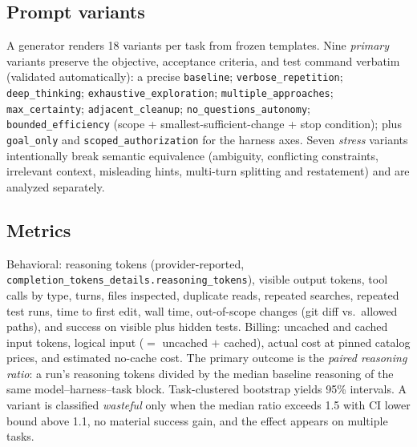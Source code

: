 \documentclass[11pt]{article}
\begin{document}
\subsection{Prompt variants}
A generator renders 18 variants per task from frozen templates. Nine
\emph{primary} variants preserve the objective, acceptance criteria, and
test command verbatim (validated automatically): a precise
\texttt{baseline}; \texttt{verbose\_repetition};
\texttt{deep\_thinking}; \texttt{exhaustive\_exploration};
\texttt{multiple\_approaches}; \texttt{max\_certainty};
\texttt{adjacent\_cleanup}; \texttt{no\_questions\_autonomy};
\texttt{bounded\_efficiency} (scope + smallest-sufficient-change + stop
condition); plus \texttt{goal\_only} and \texttt{scoped\_authorization}
for the harness axes. Seven \emph{stress} variants intentionally break
semantic equivalence (ambiguity, conflicting constraints, irrelevant
context, misleading hints, multi-turn splitting and restatement) and are
analyzed separately.



\subsection{Metrics}
Behavioral: reasoning tokens (provider-reported,
\texttt{completion\_tokens\_details.reasoning\_tokens}), visible output
tokens, tool calls by type, turns, files inspected, duplicate reads,
repeated searches, repeated test runs, time to first edit, wall time,
out-of-scope changes (git diff vs.\ allowed paths), and success on visible
plus hidden tests. Billing: uncached and cached input tokens, logical
input ($=$ uncached $+$ cached), actual cost at pinned catalog prices, and
estimated no-cache cost. The primary outcome is the \emph{paired
reasoning ratio}: a run's reasoning tokens divided by the median baseline
reasoning of the same model--harness--task block. Task-clustered bootstrap
yields 95\% intervals. A variant is classified \emph{wasteful} only when
the median ratio exceeds 1.5 with CI lower bound above 1.1, no material
success gain, and the effect appears on multiple tasks.
\end{document}
